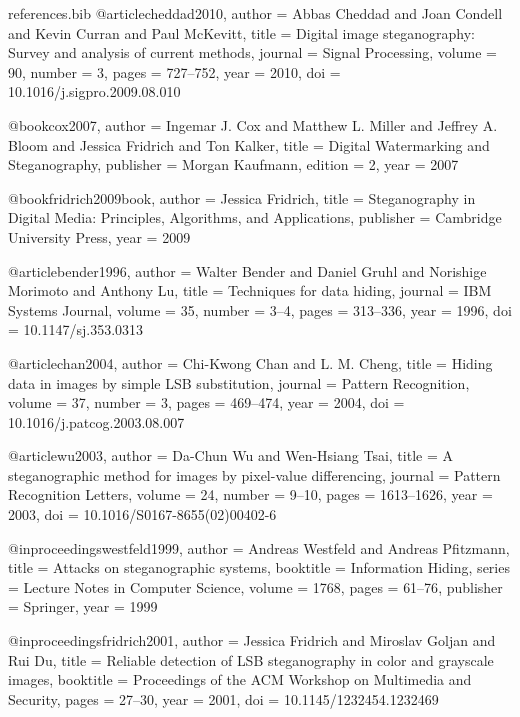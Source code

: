 \begin{filecontents*}{references.bib}
@article{cheddad2010,
  author    = {Abbas Cheddad and Joan Condell and Kevin Curran and Paul McKevitt},
  title     = {Digital image steganography: Survey and analysis of current methods},
  journal   = {Signal Processing},
  volume    = {90},
  number    = {3},
  pages     = {727--752},
  year      = {2010},
  doi       = {10.1016/j.sigpro.2009.08.010}
}

@book{cox2007,
  author    = {Ingemar J. Cox and Matthew L. Miller and Jeffrey A. Bloom and Jessica Fridrich and Ton Kalker},
  title     = {Digital Watermarking and Steganography},
  publisher = {Morgan Kaufmann},
  edition   = {2},
  year      = {2007}
}

@book{fridrich2009book,
  author    = {Jessica Fridrich},
  title     = {Steganography in Digital Media: Principles, Algorithms, and Applications},
  publisher = {Cambridge University Press},
  year      = {2009}
}

@article{bender1996,
  author    = {Walter Bender and Daniel Gruhl and Norishige Morimoto and Anthony Lu},
  title     = {Techniques for data hiding},
  journal   = {IBM Systems Journal},
  volume    = {35},
  number    = {3--4},
  pages     = {313--336},
  year      = {1996},
  doi       = {10.1147/sj.353.0313}
}

@article{chan2004,
  author    = {Chi-Kwong Chan and L. M. Cheng},
  title     = {Hiding data in images by simple {LSB} substitution},
  journal   = {Pattern Recognition},
  volume    = {37},
  number    = {3},
  pages     = {469--474},
  year      = {2004},
  doi       = {10.1016/j.patcog.2003.08.007}
}

@article{wu2003,
  author    = {Da-Chun Wu and Wen-Hsiang Tsai},
  title     = {A steganographic method for images by pixel-value differencing},
  journal   = {Pattern Recognition Letters},
  volume    = {24},
  number    = {9--10},
  pages     = {1613--1626},
  year      = {2003},
  doi       = {10.1016/S0167-8655(02)00402-6}
}

@inproceedings{westfeld1999,
  author    = {Andreas Westfeld and Andreas Pfitzmann},
  title     = {Attacks on steganographic systems},
  booktitle = {Information Hiding},
  series    = {Lecture Notes in Computer Science},
  volume    = {1768},
  pages     = {61--76},
  publisher = {Springer},
  year      = {1999}
}

@inproceedings{fridrich2001,
  author    = {Jessica Fridrich and Miroslav Goljan and Rui Du},
  title     = {Reliable detection of {LSB} steganography in color and grayscale images},
  booktitle = {Proceedings of the ACM Workshop on Multimedia and Security},
  pages     = {27--30},
  year      = {2001},
  doi       = {10.1145/1232454.1232469}
}


\end{filecontents*}
